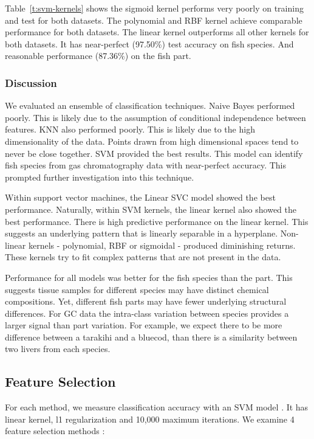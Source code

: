 \documentclass{article}
\begin{document}
Table~\ref{t:svm-kernels} shows the sigmoid kernel performs very poorly on training and test for both datasets.
The polynomial and RBF kernel achieve comparable performance for both datasets.
The linear kernel outperforms all other kernels for both datasets.
It has near-perfect (97.50\%) test accuracy on fish species.
And reasonable performance (87.36\%) on the fish part.

\subsubsection{Discussion}
\label{sec:results-classification-discussion}

We evaluated an ensemble of classification techniques.
Naive Bayes performed poorly.
This is likely due to the assumption of conditional independence between features.
KNN also performed poorly. This is likely due to the high dimensionality of the data.
Points drawn from high dimensional spaces tend to never be close together.
SVM provided the best results.
This model can identify fish species from gas chromatography data with near-perfect accuracy.
This prompted further investigation into this technique.

Within support vector machines, the Linear SVC model showed the best performance.
Naturally, within SVM kernels, the linear kernel also showed the best performance.
There is high predictive performance on the linear kernel.
This suggests an underlying pattern that is linearly separable in a hyperplane.
Non-linear kernels - polynomial, RBF or sigmoidal - produced diminishing returns.
These kernels try to fit complex patterns that are not present in the data.

Performance for all models was better for the fish species than the part.
This suggests tissue samples for different species may have distinct chemical compositions.
Yet, different fish parts may have fewer underlying structural differences.
For GC data the intra-class variation between species provides a larger signal than part variation.
For example, we expect there to be more difference between a tarakihi and a bluecod, than there is a similarity between two livers from each species.

\subsection{Feature Selection}
\label{sec:results-feature-selection}

For each method, we measure classification accuracy with an SVM model \cite{sklearn2021feature}.
It has linear kernel, l1 regularization \cite{robnik2003theoretical} and 10,000 maximum iterations.
We examine 4 feature selection methods \cite{chappers2015skfeature}:
\end{document}
